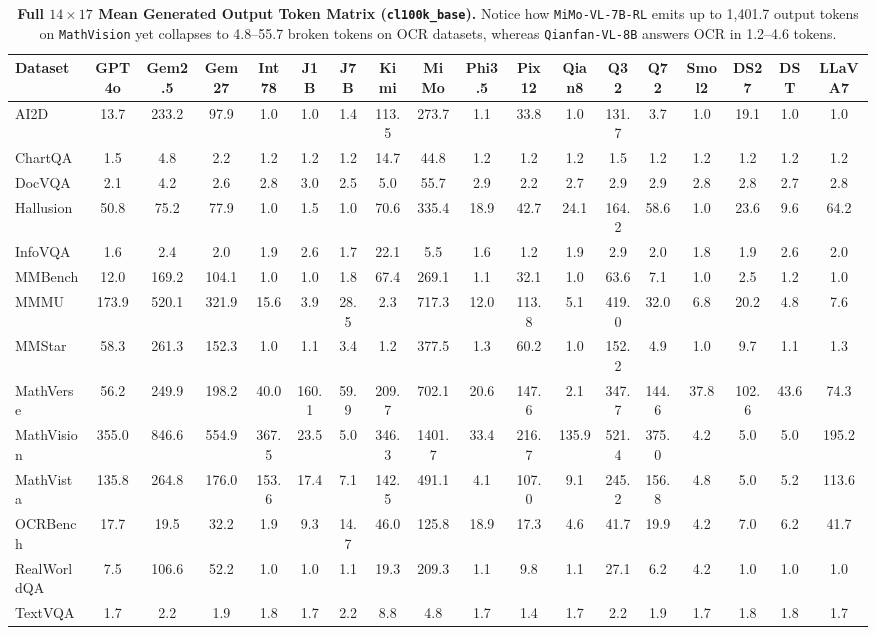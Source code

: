 \documentclass[10pt,twocolumn,letterpaper]{article}
\begin{document}
\begin{table}[t]
\centering
\tiny
\setlength{\tabcolsep}{2.3pt}
\caption{\textbf{Full $14 \times 17$ Mean Generated Output Token Matrix (\texttt{cl100k\_base}).} Notice how \texttt{MiMo-VL-7B-RL} emits up to 1,401.7 output tokens on \texttt{MathVision} yet collapses to 4.8--55.7 broken tokens on OCR datasets, whereas \texttt{Qianfan-VL-8B} answers OCR in 1.2--4.6 tokens.}
\label{tab:supp_14x17_tok}
\begin{tabular}{lccccccccccccccccc}
\toprule
\textbf{Dataset} & \textbf{GPT4o} & \textbf{Gem2.5} & \textbf{Gem27} & \textbf{Int78} & \textbf{J1B} & \textbf{J7B} & \textbf{Kimi} & \textbf{MiMo} & \textbf{Phi3.5} & \textbf{Pix12} & \textbf{Qian8} & \textbf{Q32} & \textbf{Q72} & \textbf{Smol2} & \textbf{DS27} & \textbf{DST} & \textbf{LLaVA7} \\
\midrule
AI2D & 13.7 & 233.2 & 97.9 & 1.0 & 1.0 & 1.4 & 113.5 & 273.7 & 1.1 & 33.8 & 1.0 & 131.7 & 3.7 & 1.0 & 19.1 & 1.0 & 1.0 \\
ChartQA & 1.5 & 4.8 & 2.2 & 1.2 & 1.2 & 1.2 & 14.7 & 44.8 & 1.2 & 1.2 & 1.2 & 1.5 & 1.2 & 1.2 & 1.2 & 1.2 & 1.2 \\
DocVQA & 2.1 & 4.2 & 2.6 & 2.8 & 3.0 & 2.5 & 5.0 & 55.7 & 2.9 & 2.2 & 2.7 & 2.9 & 2.9 & 2.8 & 2.8 & 2.7 & 2.8 \\
Hallusion & 50.8 & 75.2 & 77.9 & 1.0 & 1.5 & 1.0 & 70.6 & 335.4 & 18.9 & 42.7 & 24.1 & 164.2 & 58.6 & 1.0 & 23.6 & 9.6 & 64.2 \\
InfoVQA & 1.6 & 2.4 & 2.0 & 1.9 & 2.6 & 1.7 & 22.1 & 5.5 & 1.6 & 1.2 & 1.9 & 2.9 & 2.0 & 1.8 & 1.9 & 2.6 & 2.0 \\
MMBench & 12.0 & 169.2 & 104.1 & 1.0 & 1.0 & 1.8 & 67.4 & 269.1 & 1.1 & 32.1 & 1.0 & 63.6 & 7.1 & 1.0 & 2.5 & 1.2 & 1.0 \\
MMMU & 173.9 & 520.1 & 321.9 & 15.6 & 3.9 & 28.5 & 2.3 & 717.3 & 12.0 & 113.8 & 5.1 & 419.0 & 32.0 & 6.8 & 20.2 & 4.8 & 7.6 \\
MMStar & 58.3 & 261.3 & 152.3 & 1.0 & 1.1 & 3.4 & 1.2 & 377.5 & 1.3 & 60.2 & 1.0 & 152.2 & 4.9 & 1.0 & 9.7 & 1.1 & 1.3 \\
MathVerse & 56.2 & 249.9 & 198.2 & 40.0 & 160.1 & 59.9 & 209.7 & 702.1 & 20.6 & 147.6 & 2.1 & 347.7 & 144.6 & 37.8 & 102.6 & 43.6 & 74.3 \\
MathVision & 355.0 & 846.6 & 554.9 & 367.5 & 23.5 & 5.0 & 346.3 & 1401.7 & 33.4 & 216.7 & 135.9 & 521.4 & 375.0 & 4.2 & 5.0 & 5.0 & 195.2 \\
MathVista & 135.8 & 264.8 & 176.0 & 153.6 & 17.4 & 7.1 & 142.5 & 491.1 & 4.1 & 107.0 & 9.1 & 245.2 & 156.8 & 4.8 & 5.0 & 5.2 & 113.6 \\
OCRBench & 17.7 & 19.5 & 32.2 & 1.9 & 9.3 & 14.7 & 46.0 & 125.8 & 18.9 & 17.3 & 4.6 & 41.7 & 19.9 & 4.2 & 7.0 & 6.2 & 41.7 \\
RealWorldQA & 7.5 & 106.6 & 52.2 & 1.0 & 1.0 & 1.1 & 19.3 & 209.3 & 1.1 & 9.8 & 1.1 & 27.1 & 6.2 & 4.2 & 1.0 & 1.0 & 1.0 \\
TextVQA & 1.7 & 2.2 & 1.9 & 1.8 & 1.7 & 2.2 & 8.8 & 4.8 & 1.7 & 1.4 & 1.7 & 2.2 & 1.9 & 1.7 & 1.8 & 1.8 & 1.7 \\
\bottomrule
\end{tabular}
\end{table}
\end{document}
